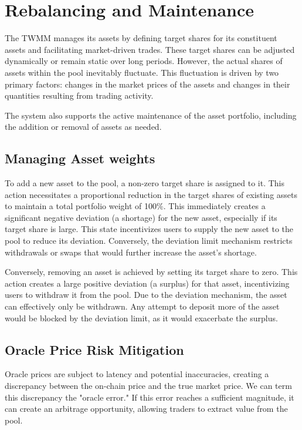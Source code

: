 \section{Rebalancing and Maintenance}

The TWMM manages its assets by defining target shares for its constituent assets and facilitating market-driven trades. These target shares can be adjusted dynamically or remain static over long periods. However, the actual shares of assets within the pool inevitably fluctuate. This fluctuation is driven by two primary factors: changes in the market prices of the assets and changes in their quantities resulting from trading activity.

The system also supports the active maintenance of the asset portfolio, including the addition or removal of assets as needed.

\subsection{Managing Asset weights}

To add a new asset to the pool, a non-zero target share is assigned to it. This action necessitates a proportional reduction in the target shares of existing assets to maintain a total portfolio weight of 100\%. This immediately creates a significant negative deviation (a shortage) for the new asset, especially if its target share is large. This state incentivizes users to supply the new asset to the pool to reduce its deviation. Conversely, the deviation limit mechanism restricts withdrawals or swaps that would further increase the asset's shortage.

Conversely, removing an asset is achieved by setting its target share to zero. This action creates a large positive deviation (a surplus) for that asset, incentivizing users to withdraw it from the pool. Due to the deviation mechanism, the asset can effectively only be withdrawn. Any attempt to deposit more of the asset would be blocked by the deviation limit, as it would exacerbate the surplus.

\subsection{Oracle Price Risk Mitigation}
Oracle prices are subject to latency and potential inaccuracies, creating a discrepancy between the on-chain price and the true market price. We can term this discrepancy the "oracle error." If this error reaches a sufficient magnitude, it can create an arbitrage opportunity, allowing traders to extract value from the pool.

